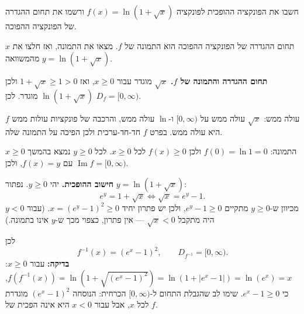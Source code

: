 
\begin{question}
חשבו את הפונקציה ההופכית לפונקציה $f(x)=\ln(1+\sqrt{x})$ ורשמו את תחום ההגדרה של הפונקציה ההפוכה.
\end{question}

\begin{hint}
תחום ההגדרה של הפונקציה ההפוכה הוא התמונה של $f$. מצאו את התמונה, ואז חלצו את $x$ מהמשוואה $y=\ln(1+\sqrt x)$.
\end{hint}

\begin{solution}
\textbf{תחום ההגדרה והתמונה של $f$.} $\sqrt x$ מוגדר עבור $x\ge0$, ואז $1+\sqrt x\ge1>0$ ולכן $\ln(1+\sqrt x)$ מוגדר. לכן $D_f=[0,\infty)$.

$f$ עולה ממש: $\sqrt x$ עולה ממש על $[0,\infty)$ ו-$\ln$ עולה ממש, והרכבה של פונקציות עולות ממש היא עולה ממש. בפרט $f$ חד-חד-ערכית ולכן הפיכה על התמונה שלה.

התמונה: $f(0)=\ln 1=0$ ולכן $f(x)\ge0$ לכל $x\ge0$. לכל $y\ge0$ נמצא בהמשך $x\ge0$ עם $f(x)=y$, ולכן $\operatorname{Im}f=[0,\infty)$.

\textbf{חישוב ההופכית.} יהי $y\ge0$. נפתור $y=\ln(1+\sqrt x)$:
\[
e^y=1+\sqrt x\iff \sqrt x=e^y-1 .
\]
מכיוון ש-$y\ge0$ מתקיים $e^y-1\ge0$, ולכן יש פתרון יחיד $x=(e^y-1)^2\ge0$. (עבור $y<0$ היה מתקבל $\sqrt x<0$ — אין פתרון, כצפוי מכך ש-$y$ אינו בתמונה.)

לכן
\[
\boxed{f^{-1}(x)=\left(e^x-1\right)^2,\qquad D_{f^{-1}}=[0,\infty).}
\]
\textbf{בדיקה:} עבור $x\ge0$: $f(f^{-1}(x))=\ln\left(1+\sqrt{(e^x-1)^2}\right)=\ln\left(1+|e^x-1|\right)=\ln(e^x)=x$, כי $e^x-1\ge0$. שימו לב שהגבלת התחום ל-$[0,\infty)$ הכרחית: הנוסחה $(e^x-1)^2$ מוגדרת לכל $x$, אבל עבור $x<0$ היא אינה הפכית של $f$.
\end{solution}
